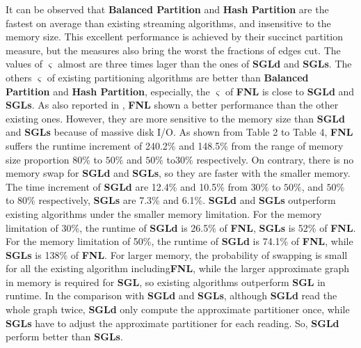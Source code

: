 \documentclass{sig-alternate-2013}
\begin{document}
It can be observed that \textbf{Balanced Partition} and \textbf{Hash Partition} are the fastest on average than existing streaming algorithms, and insensitive to the memory size. This excellent performance is achieved by their succinct partition measure, but the measures also bring the worst the fractions of edges cut. The values of $\varsigma$ almost are three times lager than the ones of \textbf{SGLd} and \textbf{SGLs}.
The others $\varsigma$ of existing partitioning algorithms are better than \textbf{Balanced Partition} and \textbf{Hash Partition}, especially, the $\varsigma$ of \textbf{FNL} is close to \textbf{SGLd} and \textbf{SGLs}. As also reported in \cite{Charalampos:fennel}, \textbf{FNL} shown a better performance than the other existing ones. However, they are more sensitive to the memory size than \textbf{SGLd} and \textbf{SGLs} because of massive disk I/O. As shown from Table 2 to Table 4, \textbf{FNL} suffers the runtime increment of 240.2\% and 148.5\% from the range of memory size proportion $80\%$ to $50\%$ and $50\%$ to$30\%$ respectively. On contrary, there is no memory swap for \textbf{SGLd} and \textbf{SGLs}, so they are faster with the smaller memory. The time increment of \textbf{SGLd} are 12.4\% and 10.5\% from $30\%$ to $50\%$, and $50\%$ to $80\%$ respectively, \textbf{SGLs} are 7.3\% and 6.1\%. \textbf{SGLd} and \textbf{SGLs} outperform existing algorithms under the smaller memory limitation. For the memory limitation of 30\%, the runtime of \textbf{SGLd} is 26.5\% of \textbf{FNL}, \textbf{SGLs} is 52\% of \textbf{FNL}. For the memory limitation of 50\%, the runtime of \textbf{SGLd} is 74.1\% of \textbf{FNL}, while \textbf{SGLs} is 138\% of \textbf{FNL}. For larger memory, the probability of swapping is small for all the existing algorithm including\textbf{FNL}, while the larger approximate graph in memory is required for \textbf{SGL}, so existing algorithms outperform \textbf{SGL} in runtime. In the comparison with \textbf{SGLd} and \textbf{SGLs}, although \textbf{SGLd} read the whole graph twice, \textbf{SGLd} only compute the approximate partitioner once, while \textbf{SGLs} have to adjust the approximate partitioner for each reading. So, \textbf{SGLd} perform better than \textbf{SGLs}.
\end{document}
